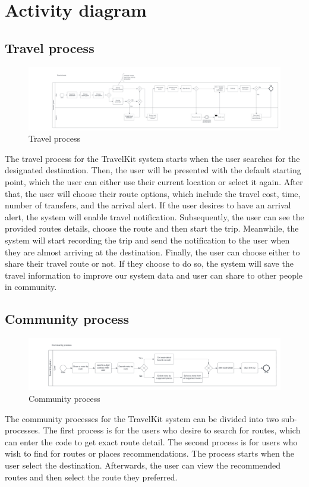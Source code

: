 \section{Activity diagram}
\subsection{Travel process}
\begin{figure}[!h]
    \centering
    \includegraphics[width=1\linewidth]{chapter3/travel-process.png}
    \caption{Travel process}
    \label{fig:Travel process}
\end{figure}
\par
The travel process for the TravelKit system starts when the user searches for the designated destination. Then, the user will be presented with the default starting point, which the user can either use their current location or select it again. After that, the user will choose their route options, which include the travel cost, time, number of transfers, and the arrival alert. If the user desires to have an arrival alert, the system will enable travel notification. Subsequently, the user can see the provided routes details, choose the route and then start the trip. Meanwhile, the system will start recording the trip and send the notification to the user when they are almost arriving at the destination. Finally, the user can choose either to share their travel route or not. If they choose to do so, the system will save the travel information to improve our system data and user can share to other people in community.

\newpage
\subsection{Community process}
\begin{figure}[!h]
    \centering
    \includegraphics[width=1\linewidth]{chapter3/community-process.png}
    \caption{Community process}
    \label{fig:Community process}
\end{figure}
\par
The community processes for the TravelKit system can be divided into two sub-processes. The first process is for the users who desire to search for routes, which can enter the code to get exact route detail. The second process is for users who wish to find for routes or  places recommendations. The process starts when the user select the destination. Afterwards, the user can view the recommended routes and then select the route they preferred.

